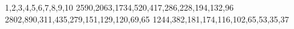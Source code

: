 1,2,3,4,5,6,7,8,9,10
2590,2063,1734,520,417,286,228,194,132,96
2802,890,311,435,279,151,129,120,69,65
1244,382,181,174,116,102,65,53,35,37
